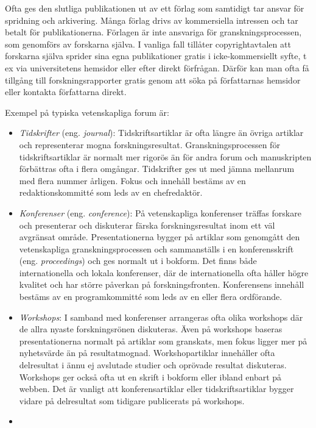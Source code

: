 Ofta ges den slutliga publikationen ut av ett förlag som samtidigt tar
ansvar för spridning och arkivering. Många förlag drivs av kommersiella
intressen och tar betalt för publikationerna. Förlagen är inte ansvariga
för granskningsprocessen, som genomförs av forskarna själva. I vanliga
fall tillåter copyrightavtalen att forskarna själva sprider sina egna
publikationer gratis i icke-kommersiellt syfte, t ex via universitetens
hemsidor eller efter direkt förfrågan. Därför kan man ofta få tillgång
till forskningsrapporter gratis genom att söka på författarnas hemsidor
eller kontakta författarna direkt.

Exempel på typiska vetenskapliga forum är:

\begin{itemize}
\item
  \emph{Tidskrifter} (eng. \emph{journal}): Tidskriftsartiklar är ofta
  längre än övriga artiklar och representerar mogna forskningsresultat.
  Granskningsprocessen för tidskriftsartiklar är normalt mer rigorös än
  för andra forum och manuskripten förbättras ofta i flera omgångar.
  Tidskrifter ges ut med jämna mellanrum med flera nummer årligen. Fokus
  och innehåll bestäms av en redaktionskommitté som leds av en
  chefredaktör.
\item
  \emph{Konferenser} (eng. \emph{conference}): På vetenskapliga
  konferenser träffas forskare och presenterar och diskuterar färska
  forskningsresultat inom ett väl avgränsat område. Presentationerna
  bygger på artiklar som genomgått den vetenskapliga
  granskningsprocessen och sammanställs i en konferensskrift (eng.
  \emph{proceedings}) och ges normalt ut i bokform. Det finns både
  internationella och lokala konferenser, där de internationella ofta
  håller högre kvalitet och har större påverkan på forskningsfronten.
  Konferensens innehåll bestäms av en programkommitté som leds av en
  eller flera ordförande.
\item
  \emph{Workshops}: I samband med konferenser arrangeras ofta olika
  workshops där de allra nyaste forskningsrönen diskuteras. Även på
  workshops baseras presentationerna normalt på artiklar som granskats,
  men fokus ligger mer på nyhetsvärde än på resultatmognad.
  Workshopartiklar innehåller ofta delresultat i ännu ej avslutade
  studier och oprövade resultat diskuteras. Workshops ger också ofta ut
  en skrift i bokform eller ibland enbart på webben. Det är vanligt att
  konferensartiklar eller tidskriftsartiklar bygger vidare på
  delresultat som tidigare publicerats på workshops.
\item

\end{itemize}
